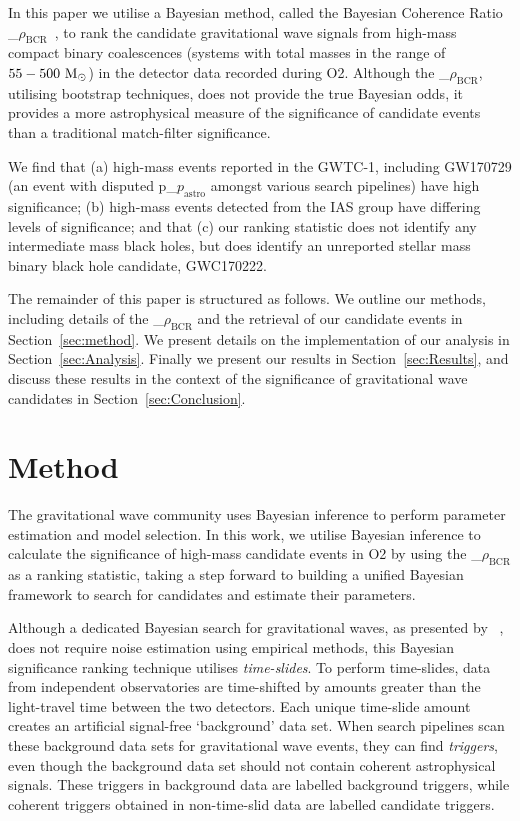 \documentclass[%
 nofootinbib,
 amsmath,amssymb,
 aps,
 twocolumn
]{revtex4-2}
\newcommand{\fancytext}[1]{{\relax\ifmmode#1\else $#1$\fi}\xspace}
\newcommand{\mathcmd}[1]{{\sc \relax\ifmmode#1\else $#1$\fi}\xspace}
\newcommand{\bcr}{\mathcmd{\rho_\text{BCR}}}
\newcommand{\msun}{\mathcmd{\text{M}_\odot}}
\newcommand{\pastro}{\fancytext{p_\text{astro}}}
\begin{document}
In this paper we utilise a Bayesian method, called the Bayesian Coherence Ratio \bcr~\cite{BCR1}, to rank the candidate gravitational wave signals from high-mass compact binary coalescences (systems with total masses in the range of $55-500\ \msun$) in the detector data recorded during O2. Although the \bcr, utilising bootstrap techniques, does not provide the true Bayesian odds, it provides a more astrophysical measure of the significance of candidate events than a traditional match-filter significance.

We find that (a) high-mass events reported in the GWTC-1, including GW170729 (an event with disputed \pastro amongst various search pipelines) have high significance; (b) high-mass events detected from the IAS group have differing levels of significance; and that (c) our ranking statistic does not identify any intermediate mass black holes, but does identify an unreported stellar mass binary black hole candidate, GWC170222.

The remainder of this paper is structured as follows. We outline our methods, including details of the \bcr and the retrieval of our candidate events in Section~\ref{sec:method}. We present details on the implementation of our analysis in Section~\ref{sec:Analysis}. Finally we present our results in Section~\ref{sec:Results}, and discuss these results in the context of the significance of gravitational wave candidates in Section~\ref{sec:Conclusion}.


\section{Method\label{sec:method}}
The gravitational wave community uses Bayesian inference to perform parameter estimation and model selection. In this work, we utilise Bayesian inference to calculate the significance of high-mass candidate events in O2 by using the \bcr as a ranking statistic, taking a step forward to building a unified Bayesian framework to search for candidates and estimate their parameters.

Although a dedicated Bayesian search for gravitational waves, as presented by ~\citet{BCR2}, does not require noise estimation using empirical methods, this Bayesian significance ranking technique utilises \textit{time-slides}. To perform time-slides, data from independent observatories are time-shifted by amounts greater than the light-travel time between the two detectors. Each unique time-slide amount creates an artificial signal-free `background' data set. When search pipelines scan these background data sets for gravitational wave events, they can find \textit{triggers}\footnotemark, even though the background data set should not contain coherent astrophysical signals. These triggers in background data are labelled background triggers, while coherent triggers obtained in non-time-slid data are labelled candidate triggers.
\end{document}
